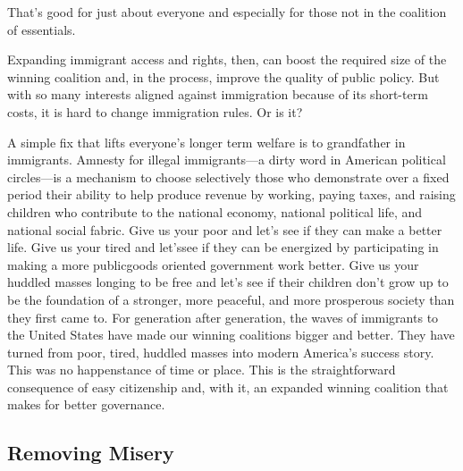 \documentclass[10pt]{article}
\begin{document}
{\large That's good for just about everyone and especially for those not in the
coalition of essentials.}

{\large Expanding immigrant access and rights, then, can boost the required size
of the winning coalition and, in the process, improve the quality of public
policy. But with so many interests aligned against immigration because of its
short-term costs, it is hard to change immigration rules. Or is it?}

{\large A simple fix that lifts everyone's longer term welfare is to grandfather
in immigrants. Amnesty for illegal immigrants---a dirty word in American
political circles---is a mechanism to choose selectively those who demonstrate
over a fixed period their ability to help produce revenue by working, paying
taxes, and raising children who contribute to the national economy, national
political life, and national social fabric. Give us your poor and let's see if
they can make a better life. Give us your tired and let'ssee if they can be
energized by participating in making a more publicgoods oriented government work
better. Give us your huddled masses longing to be free and let's see if their
children don't grow up to be the foundation of a stronger, more peaceful, and
more prosperous society than they first came to. For generation after generation,
the waves of immigrants to the United States have made our winning coalitions
bigger and better. They have turned from poor, tired, huddled masses into modern
America's success story. This was no happenstance of time or place. This is the
straightforward consequence of easy citizenship and, with it, an expanded winning
coalition that makes for better governance.}

\subsection{Removing Misery}
\end{document}
